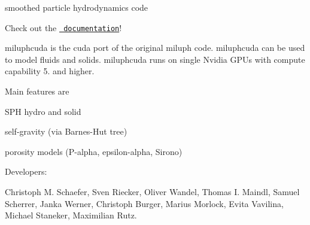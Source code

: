 smoothed particle hydrodynamics code

Check out the \href{https://michaelst98.github.io/miluphcuda/index.html}{\texttt{ documentation}}!

miluphcuda is the cuda port of the original miluph code. miluphcuda can be used to model fluids and solids. miluphcuda runs on single Nvidia G\+P\+Us with compute capability 5. and higher.

Main features are


\begin{DoxyItemize}
\item S\+PH hydro and solid
\item self-\/gravity (via Barnes-\/\+Hut tree)
\item porosity models (P-\/alpha, epsilon-\/alpha, Sirono)
\end{DoxyItemize}

Developers\+:

Christoph M. Schaefer, Sven Riecker, Oliver Wandel, Thomas I. Maindl, Samuel Scherrer, Janka Werner, Christoph Burger, Marius Morlock, Evita Vavilina, Michael Staneker, Maximilian Rutz. 